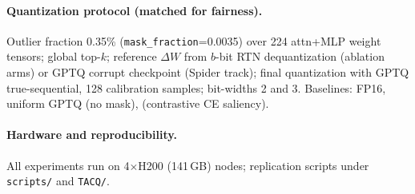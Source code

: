 \paragraph{Quantization protocol (matched for fairness).}
Outlier fraction 0.35\% (\texttt{mask\_fraction}=0.0035) over 224 attn+MLP
weight tensors; global top-$k$; reference $\Delta W$ from $b$-bit RTN
dequantization (ablation arms) or GPTQ corrupt checkpoint (Spider track);
final quantization with GPTQ true-sequential, 128 calibration samples;
bit-widths 2 and 3. Baselines: FP16, uniform GPTQ (no mask), \baseline{}
(contrastive CE saliency).

\paragraph{Hardware and reproducibility.}
All experiments run on 4$\times$H200 (141\,GB) nodes; replication scripts
under \texttt{scripts/} and \texttt{TACQ/}. 
